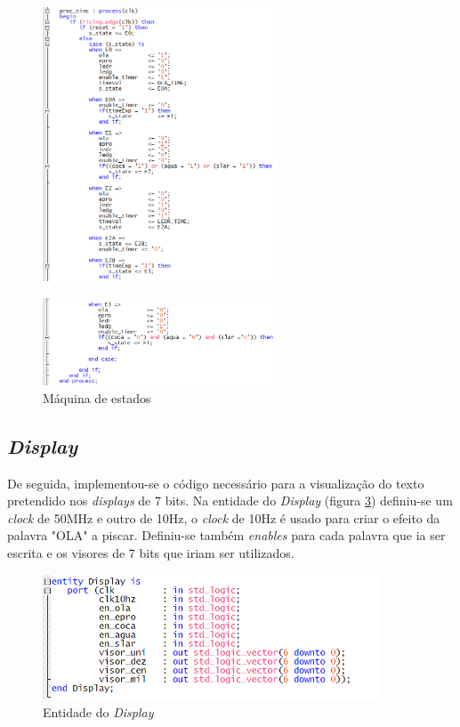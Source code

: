 \documentclass{report}
\begin{document}
\begin{figure}[H]
    \centering
    \includegraphics[width = 7cm]{Fase1FSM.png}
    \label{fig:FSM}
\end{figure}

\begin{figure}[H]
    \centering
    \includegraphics[width = 7cm]{Fase1FSME3.png}
    \caption{Máquina de estados}
    \label{fig:Estado3}
\end{figure}

\newpage

\subsection{\textit{Display}}
De seguida, implementou-se o código necessário para a visualização do texto pretendido nos \textit{displays} de 7 bits. Na entidade do \textit{Display} (figura \ref{fig:Displayentity}) definiu-se um \textit{clock} de 50MHz e outro de 10Hz, o \textit{clock} de 10Hz é usado para criar o efeito da palavra "OLA" a piscar. Definiu-se também \textit{enables} para cada palavra que ia ser escrita e os visores de 7 bits que iriam ser utilizados.

\begin{figure}[H]
    \centering
    \includegraphics[width = 10cm]{Display1entity.png}
    \caption{Entidade do \textit{Display}}
    \label{fig:Displayentity}
\end{figure}
\end{document}
